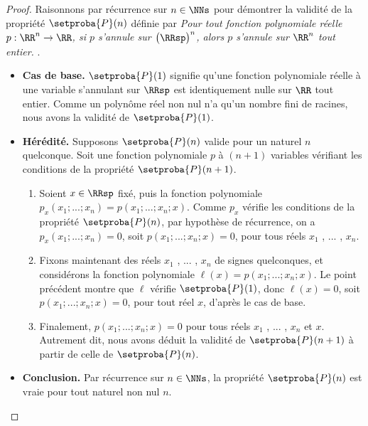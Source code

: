 \begin{proof}
	Raisonnons par récurrence sur $n \in \NNs$ pour démontrer la validité de la propriété $\setproba{P}(n)$ définie par
	\emph{\og 
		Pour tout fonction polynomiale réelle $p: \RR^n \rightarrow \RR$,
		si $p$ s'annule sur $\big( \RRsp \big)^n$,
		alors $p$ s'annule sur $\RR^n$ tout entier. 
	\fg}\kern2pt.
	\begin{itemize}[label=\small\textbullet]
		\item \textbf{Cas de base.}
		$\setproba{P}(1)$ signifie qu'une fonction polynomiale réelle à une variable s'annulant sur $\RRsp$ est identiquement nulle sur $\RR$ tout entier.
		Comme un polynôme réel non nul n'a qu'un nombre fini de racines, nous avons la validité de $\setproba{P}(1)$.


		\item \textbf{Hérédité.}
		Supposons $\setproba{P}(n)$ valide pour un naturel $n$ quelconque.
		Soit une fonction polynomiale $p$ à $(n + 1)$ variables vérifiant les conditions de la propriété $\setproba{P}(n + 1)$.
		\begin{enumerate}
		    \item Soient $x \in \RRsp$ fixé, puis la fonction polynomiale $p_x(x_1 ; ... ; x_n) = p(x_1 ; ... ; x_n ; x)$.
		    Comme $p_x$ vérifie les conditions de la propriété $\setproba{P}(n)$, par hypothèse de récurrence, on a
		    $p_x(x_1 ; ... ; x_n) = 0$, soit $p(x_1 ; ... ; x_n ; x) = 0$, pour tous réels $x_1$ , ... , $x_n$.


		    \item Fixons maintenant des réels $x_1$ , ... , $x_n$ de signes quelconques, et considérons la fonction polynomiale $\ell(x) = p(x_1 ; ... ; x_n ; x)$.
		    Le point précédent montre que $\ell$ vérifie $\setproba{P}(1)$, donc $\ell(x) = 0$, soit $p(x_1 ; ... ; x_n ; x) = 0$, pour tout réel $x$, d'après le cas de base.


		    \item Finalement, $p(x_1 ; ... ; x_n ; x) = 0$ pour tous réels $x_1$ , ... , $x_n$ et $x$.
		    Autrement dit, nous avons déduit la validité de $\setproba{P}(n+1)$ à partir de celle de $\setproba{P}(n)$.
		\end{enumerate}
		
		
		\item \textbf{Conclusion.}
		Par récurrence sur $n \in \NNs$, la propriété $\setproba{P}(n)$ est vraie pour tout naturel non nul $n$.
	\end{itemize}

	\null\vspace{-6ex}
\end{proof}



